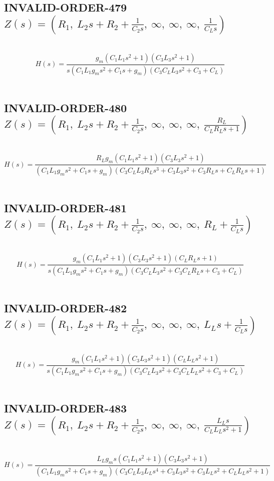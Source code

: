 \documentclass{article}
\begin{document}
\subsection{INVALID-ORDER-479 $Z(s) = \left( R_{1}, \  L_{2} s + R_{2} + \frac{1}{C_{2} s}, \  \infty, \  \infty, \  \infty, \  \frac{1}{C_{L} s}\right)$ } \ 
\textbf{\[H(s) = \frac{g_{m} \left(C_{1} L_{1} s^{2} + 1\right) \left(C_{3} L_{3} s^{2} + 1\right)}{s \left(C_{1} L_{1} g_{m} s^{2} + C_{1} s + g_{m}\right) \left(C_{3} C_{L} L_{3} s^{2} + C_{3} + C_{L}\right)}\] } \ 
\subsection{INVALID-ORDER-480 $Z(s) = \left( R_{1}, \  L_{2} s + R_{2} + \frac{1}{C_{2} s}, \  \infty, \  \infty, \  \infty, \  \frac{R_{L}}{C_{L} R_{L} s + 1}\right)$ } \ 
\textbf{\[H(s) = \frac{R_{L} g_{m} \left(C_{1} L_{1} s^{2} + 1\right) \left(C_{3} L_{3} s^{2} + 1\right)}{\left(C_{1} L_{1} g_{m} s^{2} + C_{1} s + g_{m}\right) \left(C_{3} C_{L} L_{3} R_{L} s^{3} + C_{3} L_{3} s^{2} + C_{3} R_{L} s + C_{L} R_{L} s + 1\right)}\] } \ 
\subsection{INVALID-ORDER-481 $Z(s) = \left( R_{1}, \  L_{2} s + R_{2} + \frac{1}{C_{2} s}, \  \infty, \  \infty, \  \infty, \  R_{L} + \frac{1}{C_{L} s}\right)$ } \ 
\textbf{\[H(s) = \frac{g_{m} \left(C_{1} L_{1} s^{2} + 1\right) \left(C_{3} L_{3} s^{2} + 1\right) \left(C_{L} R_{L} s + 1\right)}{s \left(C_{1} L_{1} g_{m} s^{2} + C_{1} s + g_{m}\right) \left(C_{3} C_{L} L_{3} s^{2} + C_{3} C_{L} R_{L} s + C_{3} + C_{L}\right)}\] } \ 
\subsection{INVALID-ORDER-482 $Z(s) = \left( R_{1}, \  L_{2} s + R_{2} + \frac{1}{C_{2} s}, \  \infty, \  \infty, \  \infty, \  L_{L} s + \frac{1}{C_{L} s}\right)$ } \ 
\textbf{\[H(s) = \frac{g_{m} \left(C_{1} L_{1} s^{2} + 1\right) \left(C_{3} L_{3} s^{2} + 1\right) \left(C_{L} L_{L} s^{2} + 1\right)}{s \left(C_{1} L_{1} g_{m} s^{2} + C_{1} s + g_{m}\right) \left(C_{3} C_{L} L_{3} s^{2} + C_{3} C_{L} L_{L} s^{2} + C_{3} + C_{L}\right)}\] } \ 
\subsection{INVALID-ORDER-483 $Z(s) = \left( R_{1}, \  L_{2} s + R_{2} + \frac{1}{C_{2} s}, \  \infty, \  \infty, \  \infty, \  \frac{L_{L} s}{C_{L} L_{L} s^{2} + 1}\right)$ } \ 
\textbf{\[H(s) = \frac{L_{L} g_{m} s \left(C_{1} L_{1} s^{2} + 1\right) \left(C_{3} L_{3} s^{2} + 1\right)}{\left(C_{1} L_{1} g_{m} s^{2} + C_{1} s + g_{m}\right) \left(C_{3} C_{L} L_{3} L_{L} s^{4} + C_{3} L_{3} s^{2} + C_{3} L_{L} s^{2} + C_{L} L_{L} s^{2} + 1\right)}\] } \ 
\end{document}
